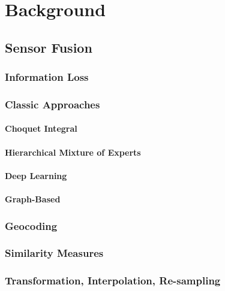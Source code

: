 \chapter{Background}



\section{Sensor Fusion}


	\subsection{Information Loss}
	
	\subsection{Classic Approaches}
	
		\subsubsection{Choquet Integral}
		
		\subsubsection{Hierarchical Mixture of Experts}
		
		\subsubsection{Deep Learning}
		
		\subsubsection{Graph-Based}
	
	\subsection{Geocoding}
	
	\subsection{Similarity Measures}
	
	\subsection{Transformation, Interpolation, Re-sampling}
	
